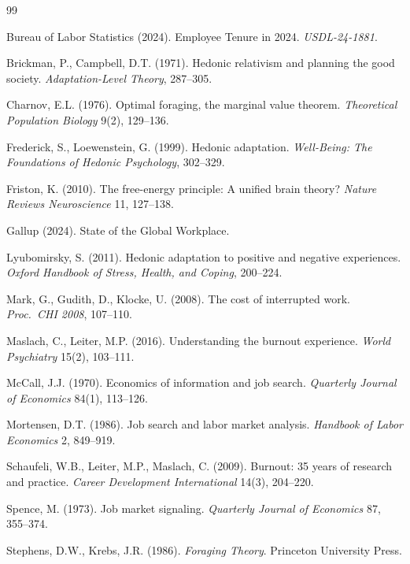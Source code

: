 \documentclass[11pt]{article}
\begin{document}
\begin{thebibliography}{99}

 Bureau of Labor Statistics (2024). Employee Tenure in 2024. \textit{USDL-24-1881}.

 Brickman, P., Campbell, D.T. (1971). Hedonic relativism and planning the good society. \textit{Adaptation-Level Theory}, 287--305.

 Charnov, E.L. (1976). Optimal foraging, the marginal value theorem. \textit{Theoretical Population Biology} 9(2), 129--136.

 Frederick, S., Loewenstein, G. (1999). Hedonic adaptation. \textit{Well-Being: The Foundations of Hedonic Psychology}, 302--329.

 Friston, K. (2010). The free-energy principle: A unified brain theory? \textit{Nature Reviews Neuroscience} 11, 127--138.

 Gallup (2024). State of the Global Workplace.

 Lyubomirsky, S. (2011). Hedonic adaptation to positive and negative experiences. \textit{Oxford Handbook of Stress, Health, and Coping}, 200--224.

 Mark, G., Gudith, D., Klocke, U. (2008). The cost of interrupted work. \textit{Proc.\ CHI 2008}, 107--110.

 Maslach, C., Leiter, M.P. (2016). Understanding the burnout experience. \textit{World Psychiatry} 15(2), 103--111.

 McCall, J.J. (1970). Economics of information and job search. \textit{Quarterly Journal of Economics} 84(1), 113--126.

 Mortensen, D.T. (1986). Job search and labor market analysis. \textit{Handbook of Labor Economics} 2, 849--919.

 Schaufeli, W.B., Leiter, M.P., Maslach, C. (2009). Burnout: 35 years of research and practice. \textit{Career Development International} 14(3), 204--220.

 Spence, M. (1973). Job market signaling. \textit{Quarterly Journal of Economics} 87, 355--374.

 Stephens, D.W., Krebs, J.R. (1986). \textit{Foraging Theory}. Princeton University Press.

\end{thebibliography}
\end{document}

